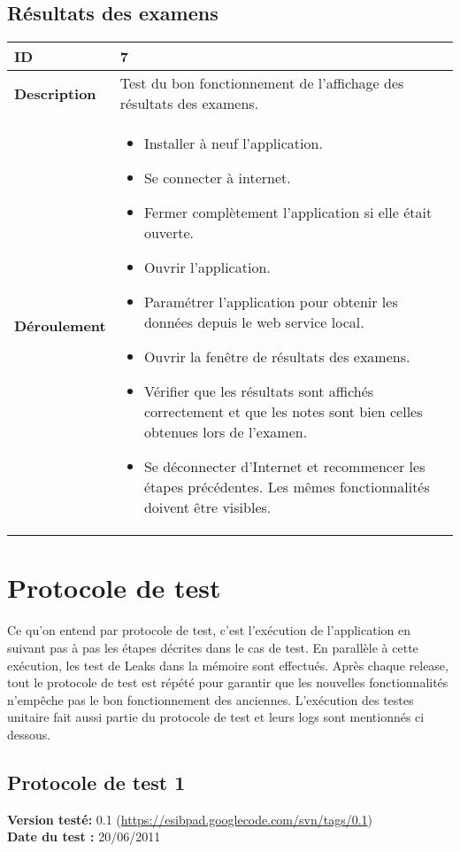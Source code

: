 		\subsection{Résultats des examens}
					 \begin{longtable}{m{4cm}|p{10cm}|}
					 \textbf{ ID} & 7 \\
					 \hline \textbf{Description} & Test du bon fonctionnement de l'affichage des résultats des examens.\\
					 \hline \textbf{Déroulement} &
						 \begin{itemize}
						  	\item Installer à neuf l'application.
						  	\item Se connecter à internet.
							 \item Fermer complètement l'application si elle était ouverte.
							 \item Ouvrir l'application.
							 \item Paramétrer l'application pour obtenir les données depuis le web service local.
							 \item Ouvrir la fenêtre de résultats des examens.
							 \item Vérifier que les résultats sont affichés correctement et que les notes sont bien celles obtenues lors de l'examen.
							\item Se déconnecter d'Internet et recommencer les étapes précédentes. Les mêmes fonctionnalités doivent être visibles.
						 \end{itemize}
					 \\
				 \end{longtable} 
\section{Protocole de test}
	Ce qu'on entend par protocole de test, c'est l'exécution de l'application en suivant pas à pas les étapes décrites dans le cas de test. En parallèle à cette exécution, les test de Leaks dans la mémoire sont effectués.
	Après chaque release, tout le protocole de test est répété pour garantir que les nouvelles fonctionnalités n'empêche pas le bon fonctionnement des anciennes.
	L'exécution des testes unitaire fait aussi partie du protocole de test et leurs logs sont mentionnés ci dessous. 
		\subsection{Protocole de test 1}
		\textbf{Version testé:} 0.1 (\url{https://esibpad.googlecode.com/svn/tags/0.1}) \\
		\textbf{	Date du test :} 20/06/2011


